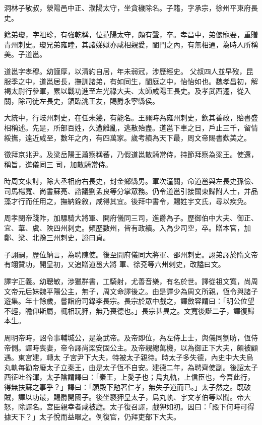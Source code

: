 \begin{pinyinscope}
 洞林子敬叔，滎陽邑中正、濮陽太守，坐貪穢除名。子籍，字承宗，徐州平東府長史。



 籍弟瓊，字祖珍，有強乾稱，位范陽太守，頗有聲，卒。孝昌中，弟儼寵要，重贈青州刺史。瓊兄弟雍睦，其諸娣姒亦咸相親愛，閨門之內，有無相通，為時人所稱美。子道邕。



 道邕字孝穆。幼謹厚，以清約自居，年未弱冠，涉歷經史。
 父叔四人並早歿，昆服季之中，道邕居長，撫訓諸弟，有如同生，閨庭之中，怡怡如也。魏孝昌初，解褐太尉行參軍，累以戰功進至左光祿大夫、太師咸陽王長史。及孝武西遷，從入關，除司徒左長史，領臨洮王友，賜爵永寧縣侯。



 大統中，行岐州刺史，在任未幾，有能名。王羆時為雍州刺史，欽其善政，貽書盛相稱述。先是，所部百姓，久遭離亂，逃散殆盡。道邕下車之日，戶止三千，留情綏撫，遠近咸至，數年之內，有四萬家。歲考績為天下最，周文帝賜書歎美之。



 徵拜京兆尹。及梁岳陽王蕭察稱蕃，乃假道邕散騎常侍，持節拜察為梁王。使還，稱旨，進儀同三
 司，加散騎常侍。



 時周文東討，除大丞相府右長史，封金鄉縣男。軍次潼關，命道邕與左長史孫儉、司馬楊寬、尚書蘇亮、諮議劉孟良等分掌眾務。仍令道邕引接關東歸附人士，并品藻才行而任用之，撫納銓敘，咸得其宜。後拜中書令，賜姓宇文氏，尋以疾免。



 周孝閔帝踐阼，加驃騎大將軍、開府儀同三司，進爵為子。歷御伯中大夫、御正、宜、華、虞、陜四州刺史。頻歷數州，皆有政績。入為少司空，卒。贈本官，加鄭、梁、北豫三州刺史，謚曰貞。



 子詡嗣，歷位納言，為聘陳使。後至開府儀同大將軍、邵州刺史。詡弟譯於隋文帝有翊贊功，開皇初，又追贈道邕大將
 軍、徐兗等六州刺史，改謚曰文。



 譯字正義。幼聰敏，涉獵群書，工騎射，尤善音樂，有名於世。譯從祖文寬，尚周文帝元后妹魏平陽公主，無子，周文命譯後之。由是譯少為周文所親，恆令與諸子遊集。年十餘歲，嘗詣府司錄李長宗。長宗於眾中戲之，譯斂容謂曰：「明公位望不輕，瞻仰斯屬，輒相玩狎，無乃喪德也。」長宗甚異之。文寬後誕二子，譯復歸本生。



 周明帝時，詔令事輔城公，是為武帝。及帝即位，為左侍上士，與儀同劉昉，恆侍帝側。譯時喪妻，帝令譯尚梁安固公主。及帝親總萬機，以為御正下大夫，頗被顧遇。東宮建，轉太
 子宮尹下大夫，特被太子親待。時太子多失德，內史中大夫烏丸軌每勸帝廢太子立秦王，由是太子恆不自安。建德二年，為聘齊使副。後詔太子西征吐谷渾，太子陰謂譯曰：「秦王，上愛子也；烏丸軌，上信臣也，今吾此行，得無扶蘇之事乎？」譯曰：「願殿下勉著仁孝，無失子道而已。」太子然之。既破賊，譯以功最，賜爵開國子。後坐褻狎皇太子，烏丸軌、宇文孝伯等以聞。帝大怒，除譯名。宮臣親幸者咸被譴。太子復召譯，戲狎如初。因曰：「殿下何時可得據天下？」太子悅而益暱之。例復官，仍拜吏部下大夫。




\end{pinyinscope}
